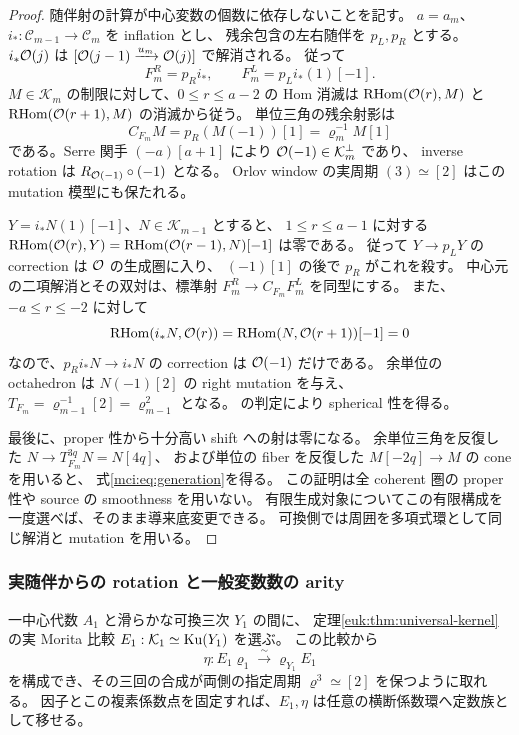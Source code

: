 \begin{proof}
随伴射の計算が中心変数の個数に依存しないことを記す。
$a=a_m$、$i_*:\mathcal C_{m-1}\to\mathcal C_m$ を inflation とし、
残余包含の左右随伴を $p_L,p_R$ とする。
$i_*\mathcal O(j)$ は $[\mathcal O(j-1)\xrightarrow{u_m}\mathcal O(j)]$ で解消される。
従って
\[
 F_m^R=p_Ri_*,\qquad F_m^L=p_Li_*(1)[-1].
\]
$M\in\mathcal K_m$ の制限に対して、$0\le r\le a-2$ の Hom 消滅は
$\operatorname{RHom}(\mathcal O(r),M)$ と
$\operatorname{RHom}(\mathcal O(r+1),M)$ の消滅から従う。
単位三角の残余射影は
\[
 C_{F_m}M=p_R(M(-1))[1]=\varrho_m^{-1}M[1]
\]
である。Serre 関手 $(-a)[a+1]$ により $\mathcal O(-1)\in\mathcal K_m^\perp$ であり、
inverse rotation は $R_{\mathcal O(-1)}\circ(-1)$ となる。
Orlov window の実周期 $(3)\simeq[2]$ はこの mutation 模型にも保たれる。

$Y=i_*N(1)[-1]$、$N\in\mathcal K_{m-1}$ とすると、
$1\le r\le a-1$ に対する
$\operatorname{RHom}(\mathcal O(r),Y)
=\operatorname{RHom}(\mathcal O(r-1),N)[-1]$ は零である。
従って $Y\to p_LY$ の correction は $\mathcal O$ の生成圏に入り、
$(-1)[1]$ の後で $p_R$ がこれを殺す。
中心元の二項解消とその双対は、標準射
$F_m^R\to C_{F_m}F_m^L$ を同型にする。
また、$-a\le r\le-2$ に対して
\[
 \operatorname{RHom}(i_*N,\mathcal O(r))
        =\operatorname{RHom}(N,\mathcal O(r+1))[-1]=0
\]
なので、$p_Ri_*N\to i_*N$ の correction は $\mathcal O(-1)$ だけである。
余単位の octahedron は $N(-1)[2]$ の right mutation を与え、
$T_{F_m}=\varrho_{m-1}^{-1}[2]=\varrho_{m-1}^2$ となる。
\cite[Theorem~5.1]{CMOAnnoLogvinenkoSpherical}の判定により spherical 性を得る。

最後に、proper 性から十分高い shift への射は零になる。
余単位三角を反復した $N\to T_{F_m}^{3q}N=N[4q]$、
および単位の fiber を反復した $M[-2q]\to M$ の cone を用いると、
式\eqref{mci:eq:generation}を得る。
この証明は全 coherent 圏の proper 性や source の smoothness を用いない。
有限生成対象についてこの有限構成を一度選べば、そのまま導来底変更できる。
可換側では周囲を多項式環として同じ解消と mutation を用いる。
\end{proof}

\subsubsection{実随伴からの rotation と一般変数数の arity}

\begin{lemma}
\label{mci:lem:rotation-transfer}
一中心代数 $A_1$ と滑らかな可換三次 $Y_1$ の間に、
定理\ref{euk:thm:universal-kernel}の実 Morita 比較
$E_1:\mathcal K_1\simeq\operatorname{Ku}(Y_1)$ を選ぶ。
この比較から
\[
             \eta:E_1\varrho_1\xrightarrow{\sim}\varrho_{Y_1}E_1
\]
を構成でき、その三回の合成が両側の指定周期 $\varrho^3\simeq[2]$ を保つように取れる。
因子とこの複素係数点を固定すれば、$E_1,\eta$ は任意の横断係数環へ定数族として移せる。
\end{lemma}


